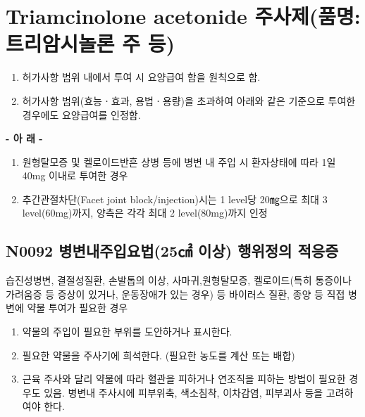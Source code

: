 \section{Triamcinolone acetonide 주사제(품명: 트리암시놀론 주 등)}
{
\par
\begin{enumerate}[1.]\tightlist
\item 허가사항 범위 내에서 투여 시 요양급여 함을 원칙으로 함.
\item 허가사항 범위(효능ㆍ효과, 용법ㆍ용량)을 초과하여 아래와 같은 기준으로 투여한 경우에도 요양급여를 인정함.
\end{enumerate}
\begin{center}\textbf{- 아 래 -}\end{center}
\begin{enumerate}[가.]\tightlist
\item 원형탈모증 및 켈로이드반흔 상병 등에 병변 내 주입 시 환자상태에 따라 1일 40mg 이내로 투여한 경우
\item 추간관절차단(Facet joint block/injection)시는 1 level당 20㎎으로 최대 3 level(60mg)까지, 양측은 각각 최대 2 level(80mg)까지 인정
\end{enumerate}
}


\subsection{N0092  병변내주입요법(25㎠ 이상) 행위정의 적응증}
습진성병변, 결절성질환, 손발톱의 이상, 사마귀,원형탈모증, 켈로이드(특히 통증이나 가려움증 등 증상이 있거나, 운동장애가 있는 경우) 등 바이러스 질환, 종양 등 직접 병변에 약물 투여가 필요한 경우\par
{}
\begin{enumerate}[1.]\tightlist
\item 약물의 주입이 필요한 부위를 도안하거나 표시한다.
\item 필요한 약물을 주사기에 희석한다. (필요한 농도를 계산 또는 배합)
\item 근육 주사와 달리 약물에 따라 혈관을 피하거나 연조직을 피하는 방법이 필요한 경우도 있음. 병변내 주사시에 피부위축, 색소침착, 이차감염, 피부괴사 등을 고려하여야 한다.
\end{enumerate}